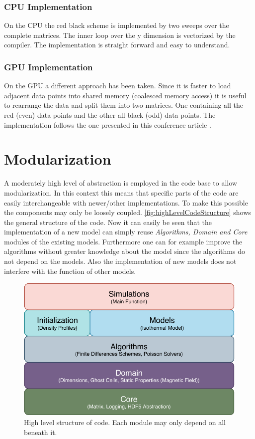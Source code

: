\subsubsection{CPU Implementation}
On the CPU the red black scheme is implemented by two sweeps over the complete matrices. The inner loop over the y dimension is vectorized by the compiler. The implementation is straight forward and easy to understand.

\subsubsection{GPU Implementation}
On the GPU a different approach has been taken. Since it is faster to load adjacent data points into shared memory (coalesced memory access) it is useful to rearrange the data and split them into two matrices. One containing all the red (even) data points and the other all black (odd) data points. The implementation follows the one presented in this conference article \cite{CUDARedBlack}.

\section{Modularization}
A moderately high level of abstraction is employed in the code base to allow modularization. In this context this means that specific parts of the code are easily interchangeable with newer/other implementations. To make this possible the components may only be loosely coupled. \autoref{fig:highLevelCodeStructure} shows the general structure of the code. Now it can easily be seen that the implementation of a new model can simply reuse \textit{Algorithms, Domain and Core} modules of the existing models. Furthermore one can for example improve the algorithms without greater knowledge about the model since the algorithms do not depend on the models. Also the implementation of new models does not interfere with the function of other models.
\begin{figure}[h]
    \centering
    \includegraphics[]{pdfs/code_modules_high_level.pdf}
    \caption{High level structure of code. Each module may only depend on all beneath it.}
    \label{fig:highLevelCodeStructure}
\end{figure}

